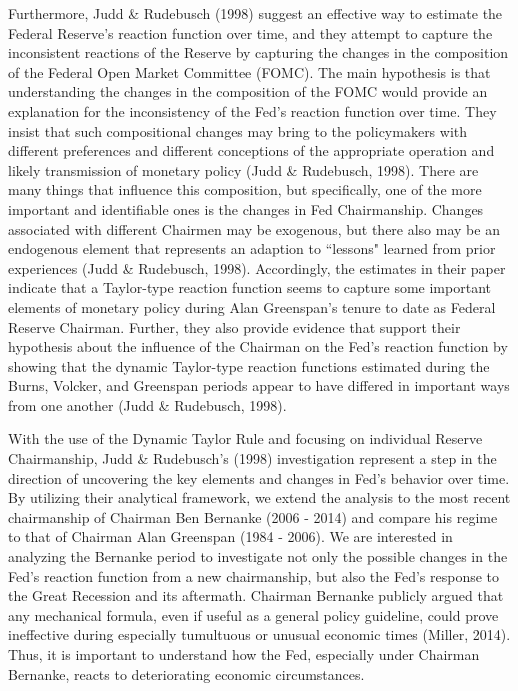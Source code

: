 \documentclass[notitlepage,12pt]{article}
\begin{document}
Furthermore, Judd \& Rudebusch (1998) suggest an effective way to estimate the Federal Reserve's reaction function over time, and they attempt to capture the inconsistent reactions of the Reserve by capturing the changes in the composition of the Federal Open Market Committee (FOMC). The main hypothesis is that understanding the changes in the composition of the FOMC would provide an explanation for the inconsistency of the Fed’s reaction function over time. They insist that such compositional changes may bring to the policymakers with different preferences and different conceptions of the appropriate operation and likely transmission of monetary policy (Judd \& Rudebusch, 1998). There are many things that influence this composition, but specifically, one of the more important and identifiable ones is the changes in Fed Chairmanship. Changes associated with different Chairmen may be exogenous, but there also may be an endogenous element that represents an adaption to ``lessons" learned from prior experiences (Judd \& Rudebusch, 1998). Accordingly, the estimates in their paper indicate that a Taylor-type reaction function seems to capture some important elements of monetary policy during Alan Greenspan's tenure to date as Federal Reserve Chairman. Further, they also provide evidence that support their hypothesis about the influence of the Chairman on the Fed's reaction function by showing that the dynamic Taylor-type reaction functions estimated during the Burns, Volcker, and Greenspan periods appear to have differed in important ways from one another (Judd \& Rudebusch, 1998). 

With the use of the Dynamic Taylor Rule and focusing on individual Reserve Chairmanship, Judd \& Rudebusch's (1998) investigation represent a step in the direction of uncovering the key elements and changes in Fed's behavior over time. By utilizing their analytical framework, we extend the analysis to the most recent chairmanship of Chairman Ben Bernanke (2006 - 2014) and compare his regime to that of Chairman Alan Greenspan (1984 - 2006). We are interested in analyzing the Bernanke period to investigate not only the possible changes in the Fed's reaction function from a new chairmanship, but also the Fed’s response to the Great Recession and its aftermath. Chairman Bernanke publicly argued that any mechanical formula, even if useful as a general policy guideline, could prove ineffective during especially tumultuous or unusual economic times (Miller, 2014). Thus, it is important to understand how the Fed, especially under Chairman Bernanke, reacts to deteriorating economic circumstances.
\end{document}
